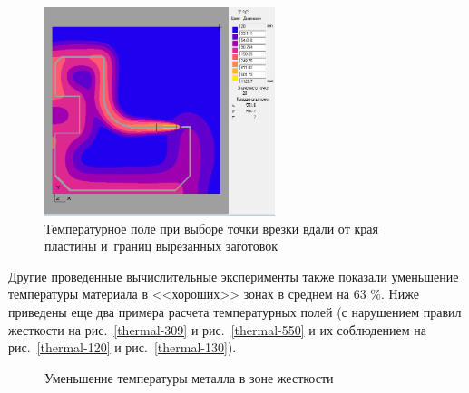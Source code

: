 \documentclass[11pt,twoside,openany]{report}
\begin{document}
\begin{figure}
  \centering
  \includegraphics[width=0.6\textwidth]{thermal-low.png}
  \caption{Температурное поле при выборе точки врезки вдали от края пластины и~границ вырезанных заготовок}
  \label{thrm-low}
\end{figure}

Другие проведенные вычислительные эксперименты
также показали уменьшение температуры материала
в <<хороших>> зонах в среднем на 63 \%.
Ниже приведены еще два примера расчета температурных полей
(с нарушением правил жесткости на рис.~\ref{thermal-309}
и рис.~\ref{thermal-550}
и их соблюдением на рис.~\ref{thermal-120}
и рис.~\ref{thermal-130}).

\begin{figure}
  \centering
  \caption{Уменьшение температуры металла в зоне жесткости }
  \label{thermal-309-120}
\end{figure}
\end{document}
